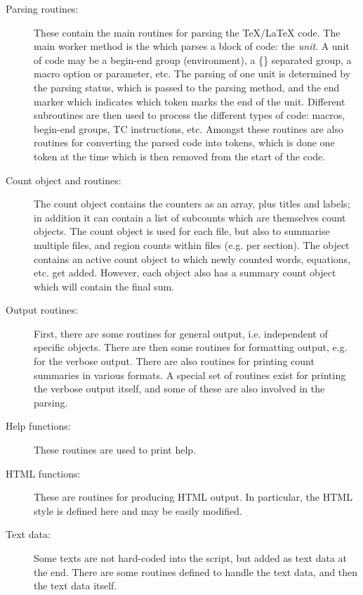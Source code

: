\documentclass{article}
\begin{document}
\begin{description}
\item[Parsing routines:] These contain the main routines for parsing the \TeX/\LaTeX{} code. The main worker method is the  which parses a block of code: the \emph{unit}. A unit of code may be a begin-end group (environment), a \{\} separated group, a macro option or parameter, etc. The parsing of one unit is determined by the parsing status, which is passed to the parsing method, and the end marker which indicates which token marks the end of the unit. Different subroutines are then used to process the different types of code: macros, begin-end groups, TC instructions, etc. Amongst these routines are also routines for converting the parsed code into tokens, which is done one token at the time which is then removed from the start of the code.

\item[Count object and routines:] The count object contains the counters as an array, plus titles and labels; in addition it can contain a list of subcounts which are themselves count objects. The count object is used for each file, but also to summarise multiple files, and region counts within files (e.g. per section). The  object contains an active count object to which newly counted words, equations, etc. get added. However, each  object also has a summary count object which will contain the final sum. 

\item[Output routines:] First, there are some routines for general output, i.e. independent of specific  objects. There are then some routines for formatting output, e.g. for the verbose output. There are also routines for printing count summaries in various formats. A special set of routines exist for printing the verbose output itself, and some of these are also involved in the parsing.

\item[Help functions:] These routines are used to print help.

\item[HTML functions:] These are routines for producing HTML output. In particular, the HTML style is defined here and may be easily modified.

\item[Text data:] Some texts are not hard-coded into the script, but added as text data at the end. There are some routines defined to handle the text data, and then the text data itself.

\end{description}
\end{document}
